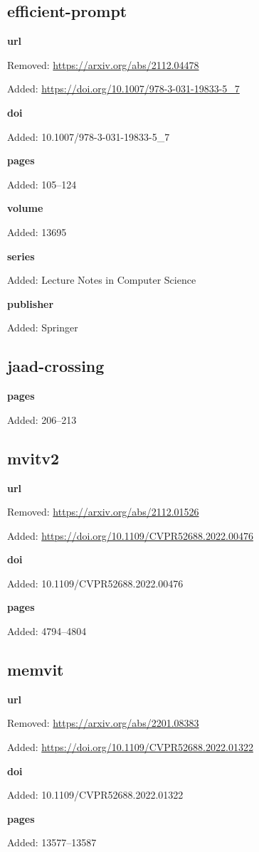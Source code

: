 \subsection*{efficient-prompt}
\noindent\textbf{url}\par
{\color{AuditRed}Removed: \url{https://arxiv.org/abs/2112.04478}\par}
{\color{AuditGreen}Added: \url{https://doi.org/10.1007/978-3-031-19833-5_7}\par}
\noindent\textbf{doi}\par
{\color{AuditGreen}Added: 10.1007/978-3-031-19833-5\_7\par}
\noindent\textbf{pages}\par
{\color{AuditGreen}Added: 105–124\par}
\noindent\textbf{volume}\par
{\color{AuditGreen}Added: 13695\par}
\noindent\textbf{series}\par
{\color{AuditGreen}Added: Lecture Notes in Computer Science\par}
\noindent\textbf{publisher}\par
{\color{AuditGreen}Added: Springer\par}
\medskip

\subsection*{jaad-crossing}
\noindent\textbf{pages}\par
{\color{AuditGreen}Added: 206–213\par}
\medskip

\subsection*{mvitv2}
\noindent\textbf{url}\par
{\color{AuditRed}Removed: \url{https://arxiv.org/abs/2112.01526}\par}
{\color{AuditGreen}Added: \url{https://doi.org/10.1109/CVPR52688.2022.00476}\par}
\noindent\textbf{doi}\par
{\color{AuditGreen}Added: 10.1109/CVPR52688.2022.00476\par}
\noindent\textbf{pages}\par
{\color{AuditGreen}Added: 4794–4804\par}
\medskip

\subsection*{memvit}
\noindent\textbf{url}\par
{\color{AuditRed}Removed: \url{https://arxiv.org/abs/2201.08383}\par}
{\color{AuditGreen}Added: \url{https://doi.org/10.1109/CVPR52688.2022.01322}\par}
\noindent\textbf{doi}\par
{\color{AuditGreen}Added: 10.1109/CVPR52688.2022.01322\par}
\noindent\textbf{pages}\par
{\color{AuditGreen}Added: 13577–13587\par}
\medskip

